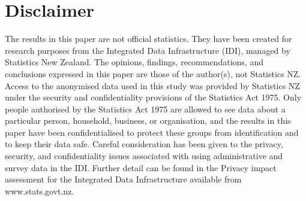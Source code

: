 \section{Disclaimer}
The results in this paper are not official statistics. They have been created for research purposes from the Integrated Data Infrastructure (IDI), managed by Statistics New Zealand. The opinions, findings, recommendations, and conclusions expressed in this paper are those of the author(s), not Statistics NZ. Access to the anonymised data used in this study was provided by Statistics NZ under the security and confidentiality provisions of the Statistics Act 1975. Only people authorised by the Statistics Act 1975 are allowed to see data about a particular person, household, business, or organisation, and the results in this paper have been confidentialised to protect these groups from identification and to keep their data safe. Careful consideration has been given to the privacy, security, and confidentiality issues associated with using administrative and survey data in the IDI. Further detail can be found in the Privacy impact assessment for the Integrated Data Infrastructure available from www.stats.govt.nz. 


